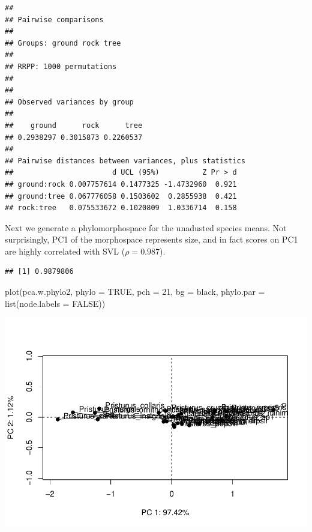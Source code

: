 \documentclass[
  11pt,
]{article}
\newenvironment{Shaded}{\begin{snugshade}}{\end{snugshade}}
\newcommand{\AttributeTok}[1]{\textcolor[rgb]{0.77,0.63,0.00}{#1}}
\newcommand{\ConstantTok}[1]{\textcolor[rgb]{0.00,0.00,0.00}{#1}}
\newcommand{\DecValTok}[1]{\textcolor[rgb]{0.00,0.00,0.81}{#1}}
\newcommand{\FunctionTok}[1]{\textcolor[rgb]{0.00,0.00,0.00}{#1}}
\newcommand{\NormalTok}[1]{#1}
\newcommand{\OtherTok}[1]{\textcolor[rgb]{0.56,0.35,0.01}{#1}}
\newcommand{\SpecialCharTok}[1]{\textcolor[rgb]{0.00,0.00,0.00}{#1}}
\newcommand{\StringTok}[1]{\textcolor[rgb]{0.31,0.60,0.02}{#1}}
\begin{document}
\begin{verbatim}
## 
## Pairwise comparisons
## 
## Groups: ground rock tree 
## 
## RRPP: 1000 permutations
## 
## 
## Observed variances by group
## 
##    ground      rock      tree 
## 0.2938297 0.3015873 0.2260537 
## 
## Pairwise distances between variances, plus statistics
##                       d UCL (95%)          Z Pr > d
## ground:rock 0.007757614 0.1477325 -1.4732960  0.921
## ground:tree 0.067776058 0.1503602  0.2855938  0.421
## rock:tree   0.075533672 0.1020809  1.0336714  0.158
\end{verbatim}

Next we generate a phylomorphospace for the unadusted species means. Not
surprisingly, PC1 of the morphospace represents size, and in fact scores
on PC1 are highly correlated with SVL (\(\rho=0.987\)).

\begin{Shaded}
\end{Shaded}

\begin{verbatim}
## [1] 0.9879806
\end{verbatim}

\begin{Shaded}
\begin{Highlighting}[]
\FunctionTok{plot}\NormalTok{(pca.w.phylo2, }\AttributeTok{phylo =} \ConstantTok{TRUE}\NormalTok{, }\AttributeTok{pch =} \DecValTok{21}\NormalTok{, }\AttributeTok{bg =} \StringTok{\textquotesingle{}black\textquotesingle{}}\NormalTok{, }
     \AttributeTok{phylo.par =} \FunctionTok{list}\NormalTok{(}\AttributeTok{node.labels =} \ConstantTok{FALSE}\NormalTok{))}
\end{Highlighting}
\end{Shaded}

\includegraphics{Pristurus-SuppInfo-R2_files/figure-latex/unnamed-chunk-12-1.pdf}
\end{document}
